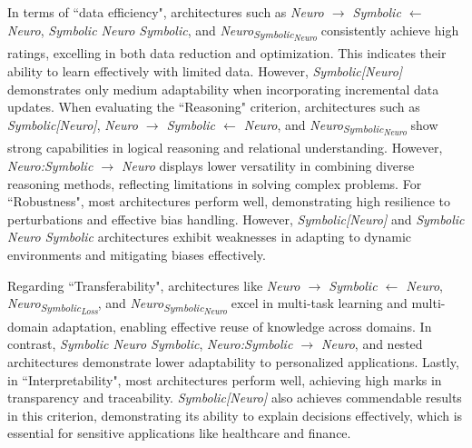 \documentclass[12pt]{article}
\begin{document}
\vspace*{0.5cm}

In terms of ``data efficiency", architectures such as \textit{Neuro $\to$ Symbolic $\leftarrow$ Neuro}, \textit{Symbolic Neuro Symbolic}, and \textit{Neuro\textsubscript{Symbolic\textsubscript{Neuro}}} consistently achieve high ratings, excelling in both data reduction and optimization. This indicates their ability to learn effectively with limited data. However, \textit{Symbolic[Neuro]} demonstrates only medium adaptability when incorporating incremental data updates. When evaluating the ``Reasoning" criterion, architectures such as \textit{Symbolic[Neuro]}, \textit{Neuro $\to$ Symbolic $\leftarrow$ Neuro}, and \textit{Neuro\textsubscript{Symbolic\textsubscript{Neuro}}} show strong capabilities in logical reasoning and relational understanding. However, \textit{Neuro:Symbolic $\to$ Neuro} displays lower versatility in combining diverse reasoning methods, reflecting limitations in solving complex problems. For ``Robustness", most architectures perform well, demonstrating high resilience to perturbations and effective bias handling. However, \textit{Symbolic[Neuro]} and \textit{Symbolic Neuro Symbolic} architectures exhibit weaknesses in adapting to dynamic environments and mitigating biases effectively. 

\vspace*{0.5cm}

Regarding ``Transferability", architectures like \textit{Neuro $\to$ Symbolic $\leftarrow$ Neuro}, \textit{Neuro\textsubscript{Symbolic\textsubscript{Loss}}}, and \textit{Neuro\textsubscript{Symbolic\textsubscript{Neuro}}} excel in multi-task learning and multi-domain adaptation, enabling effective reuse of knowledge across domains. In contrast, \textit{Symbolic Neuro Symbolic}, \textit{Neuro:Symbolic $\to$ Neuro}, and nested architectures demonstrate lower adaptability to personalized applications.
Lastly, in ``Interpretability", most architectures perform well, achieving high marks in transparency and traceability. \textit{Symbolic[Neuro]} also achieves commendable results in this criterion, demonstrating its ability to explain decisions effectively, which is essential for sensitive applications like healthcare and finance.

\vspace*{0.5cm}
\end{document}
